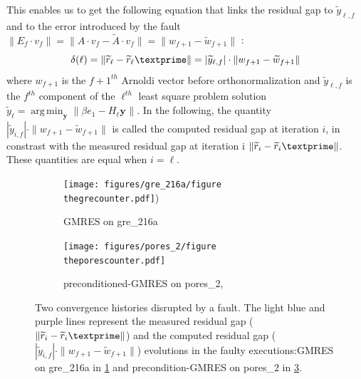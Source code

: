 \documentclass[twoside]{article}
\newcounter{fig}\setcounter{fig}{0}
\DeclareMathOperator*{\argmin}{arg\,min}
\begin{document}
  This enables us to get the following equation that links the residual gap to $\widetilde{y}_{\ell, f}$ and to the error introduced by the fault $\|E_f \cdot v_f\| = \|A \cdot {v}_{f} - \widetilde{A} \cdot v_{f}\| = \|{w}_{f+1} - \widetilde{w}_{f+1}\|$ :
  \begin{equation}\label{eqn:delta}
    \delta(\ell) = \|\widetilde{r}_{\ell} - \widetilde{r}_{\ell}\textprime \| = |\widetilde{y}_{{\ell}, f}|\cdot \|{w}_{f+1} - \widetilde{w}_{f+1}\|
  \end{equation}
  where  $w_{f+1}$ is the $f+1^{th}$ Arnoldi vector before orthonormalization and $\widetilde{y}_{\ell, f}$ is the $f^{th}$ component of the $\ell^{th}$ least square problem solution $\widetilde{y}_\ell=\argmin_{\mathbf{y_{}}}\|\beta e_1 - H_{\ell} \mathbf{y_{}}\|$. In the following, the quantity $|\widetilde{y}_{{i}, f}|\cdot \|{w}_{f+1} - \widetilde{w}_{f+1}\|$ is called the computed residual gap at iteration $i$, in constrast with the measured residual gap at iteration i $\|\widetilde{r}_{i} - \widetilde{r}_{i}\textprime \|$. These quantities are equal when $i = \ell$.


  \begin{figure}[H]
    \centering
    \begin{subfigure}[t]{0.45\linewidth}
      \centering
      \texttt{[image: figures/gre\_216a/figure\\thegrecounter.pdf]})
      \caption{GMRES on gre_216a}\label{fig:gre_216a_conv_hist_delta}		
    \end{subfigure}
    \quad
    \begin{subfigure}[t]{0.45\linewidth}
      \centering
      \texttt{[image: figures/pores\_2/figure\\theporescounter.pdf]}
      \caption{preconditioned-GMRES on pores_2, }\label{fig:pores_2_conv_hist_delta}
    \end{subfigure}
    \caption{Two convergence histories disrupted by a fault. The light blue and purple lines represent the measured residual gap ($\|\widetilde{r}_{i} - \widetilde{r}_{i}\textprime \|$) and the computed residual gap ($|\widetilde{y}_{{i}, f}|\cdot \|{w}_{f+1} - \widetilde{w}_{f+1}\|$) evolutions in the faulty executions:GMRES on gre_216a in \ref{fig:gre_216a_conv_hist_delta} and precondition-GMRES  on pores_2 in \ref{fig:pores_2_conv_hist_delta}.}
  \end{figure}
\end{document}
